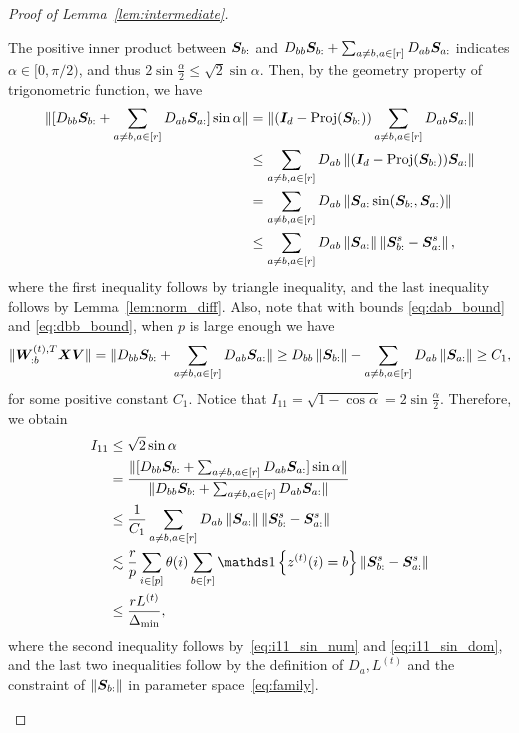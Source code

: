 \documentclass[lettersize,onecolumn,journal]{IEEEtran}
\theoremstyle{definition}
\theoremstyle{definition}
\newcommand{\offf}[1]{\left\{#1\right\}}
\begin{document}
\begin{proof}[Proof of Lemma~\ref{lem:intermediate}]
\begin{enumerate}
    The positive inner product between $\bm S_{b:}$ and $D_{bb} \bm S_{b:} + \sum_{a \neq b, a \in [r]} D_{ab} \bm S_{a:}$ indicates $\alpha \in [0,  \pi/2)$, and thus $2\sin \frac{\alpha}{2} \leq \sqrt{2} \sin \alpha$. Then, by the geometry property of trigonometric function, we have 
    \begin{align}
       \onormSize{}{ [D_{bb} \mS_{b:} + \sum_{a \neq b, a \in [r]} D_{ab} \mS_{a:}] \sin \alpha} &= \onormSize{}{(\mI_d - \text{Proj}(\mS_{b:})) \sum_{a \neq b, a \in [r]} D_{ab} \mS_{a:}}\\
       &\leq \sum_{a \neq b, a \in [r]} D_{ab} \onorm{(\mI_d - \text{Proj}(\mS_{b:}))\mS_{a:}  }\\
       &= \sum_{a \neq b, a \in [r]} D_{ab} \onorm{ \mS_{a:} \sin (\mS_{b:}, \mS_{a:}) }\\
       & \leq \sum_{a \neq b, a \in [r]} D_{ab} \onorm{\mS_{a:}} \onorm{ \mS^s_{b:} - \mS^s_{a:}}, \label{eq:i11_sin_num}
    \end{align}
    where the first inequality follows by triangle inequality, and the last inequality follows by Lemma~\ref{lem:norm_diff}. Also, note that with bounds \eqref{eq:dab_bound} and \eqref{eq:dbb_bound}, when $p$ is large enough we have 
    \begin{equation}\label{eq:i11_sin_dom}
           \onormSize{}{\mW_{:b}^{(t), T} \mX \mV } = \onormSize{}{ D_{bb} \mS_{b:} + \sum_{a \neq b, a \in [r]} D_{ab} \mS_{a:}}  \geq D_{bb} \onorm{\mS_{b:}} - \sum_{a \neq b, a \in [r]} D_{ab} \onorm{ \mS_{a:}} \geq C_1,
    \end{equation}
    for some positive constant $C_1$. Notice that $I_{11} = \sqrt{1 - \cos \alpha} = 2 \sin \frac{\alpha}{2}$. Therefore, we obtain
    \begin{align}
        I_{11} &\leq \sqrt{2} \sin \alpha \\
        & = \frac{  \onormSize{}{ [D_{bb} \mS_{b:} + \sum_{a \neq b, a \in [r]} D_{ab} \mS_{a:}] \sin \alpha}}{  \onormSize{}{ D_{bb} \mS_{b:} + \sum_{a \neq b, a \in [r]} D_{ab} \mS_{a:}} } \\
        & \leq \frac{ 1}{C_1}  \sum_{a \neq b, a \in [r]} D_{ab} \onorm{\mS_{a:}} \onorm{ \mS^s_{b:} - \mS^s_{a:}} \\
        & \lesssim \frac{r}{p} \sum_{i \in [p]} \theta(i) \sum_{b \in [r]} \ind\offf{z^{(t)}(i) = b} \onorm{ \mS^s_{b:} - \mS^s_{a:}}\\
        & \leq \frac{r L^{(t)}}{\Delta_{\min}},\label{eq:i11}
    \end{align}
    where the second inequality follows by~\eqref{eq:i11_sin_num} and \eqref{eq:i11_sin_dom}, and the last two inequalities follow by the definition of $D_a, L^{(t)}$ and the constraint of $\left\lVert\bm S_{b:}\right\rVert$ in parameter space~\eqref{eq:family}.
    

\end{enumerate}
\end{proof}
\end{document}
